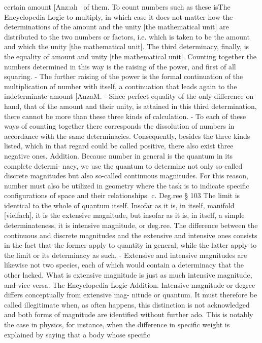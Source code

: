 {{certain amount [Anz:ah~ of them. To count numbers such as these isThe Encyclopedia Logic
to multiply, in which case it does not matter how the determinations
of the amount and the unity [the mathematical unit] are distributed
to the two numbers or factors, i.e. which is taken to be the amount
and which the unity [the mathematical unit].
The third determinacy, finally, is the equality of amount and
unity [the mathematical unit]. Counting together the numbers
determined in this way is the raising of the power, and first of
all squaring. - The further raising of the power is the formal
continuation of the multiplication of number with itself, a
continuation that leads again to the indeterminate amount
[AnzaM. - Since perfect equality of the only difference on hand,
that of the amount and their unity, is attained in this third
determination, there cannot be more than these three kinds of
calculation. - To each of these ways of counting together there
corresponds the dissolution of numbers in accordance with the same
determinacies. Consequently, besides the three kinds listed, which
in that regard could be called positive, there also exist three negative
ones.
Addition. Because number in general is the quantum in its complete determi-
nacy, we use the quantum to determine not only so-called discrete magnitudes
but also so-called continuous magnitudes. For this reason, number must also be
utilized in geometry where the task is to indicate specific configurations of space
and their relationships.
c. Deg.ree
§ 103
The limit is identical to the whole of quantum itself. Insofar as it is, in
itself, manifold [vielfach], it is the extensive magnitude, but insofar as it is,
in itself, a simple determinateness, it is intensive magnitude, or deg.ree.
The difference between the continuous and discrete magnitudes and
the extensive and intensive ones consists in the fact that the former
apply to quantity in general, while the latter apply to the limit or
its determinacy as such. - Extensive and intensive magnitudes are
likewise not two species, each of which would contain a determinacy
that the other lacked. What is extensive magnitude is just as much
intensive magnitude, and vice versa.
The Encyclopedia Logic
Addition. Intensive magnitude or degree differs conceptually from extensive mag-
nitude or quantum. It must therefore be called illegitimate when, as often happens,
this distinction is not acknowledged and both forms of magnitude are identified
without further ado. This is notably the case in physics, for instance, when the
difference in specific weight is explained by saying that a body whose specific
}}
